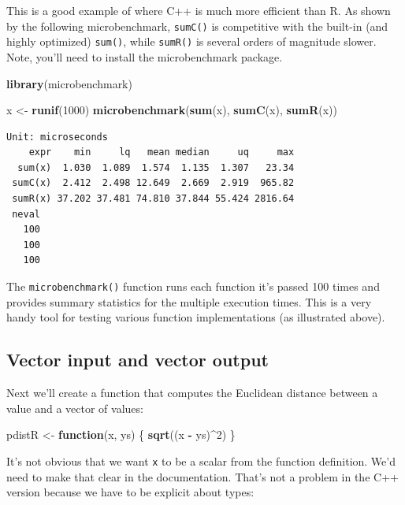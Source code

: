 \documentclass[]{krantz}
\makeatletter
\newenvironment{Shaded}{\begin{snugshade}}{\end{snugshade}}
\newcommand{\KeywordTok}[1]{\textcolor[rgb]{0.27,0.27,0.27}{\textbf{#1}}}
\newcommand{\DecValTok}[1]{\textcolor[rgb]{0.06,0.06,0.06}{#1}}
\newcommand{\StringTok}[1]{\textcolor[rgb]{0.5,0.5,0.5}{#1}}
\newcommand{\ControlFlowTok}[1]{\textcolor[rgb]{0.27,0.27,0.27}{\textbf{#1}}}
\newcommand{\OperatorTok}[1]{\textcolor[rgb]{0.43,0.43,0.43}{\textbf{#1}}}
\newcommand{\NormalTok}[1]{#1}
\newenvironment{kframe}{%
\medskip{}
\setlength{\fboxsep}{.8em}
 \def\at@end@of@kframe{}%
 \ifinner\ifhmode%
  \def\at@end@of@kframe{\end{minipage}}%
  \begin{minipage}{\columnwidth}%
 \fi\fi%
 \def\FrameCommand##1{\hskip\@totalleftmargin \hskip-\fboxsep
 \colorbox{shadecolor}{##1}\hskip-\fboxsep
     \hskip-\linewidth \hskip-\@totalleftmargin \hskip\columnwidth}%
 \MakeFramed {\advance\hsize-\width
   \@totalleftmargin\z@ \linewidth\hsize
   \@setminipage}}%
 {\par\unskip\endMakeFramed%
 \at@end@of@kframe}
\renewenvironment{Shaded}{\begin{kframe}}{\end{kframe}}
\makeatother
\begin{document}
This is a good example of where C++ is much more efficient than R. As
shown by the following microbenchmark, \texttt{sumC()} is competitive
with the built-in (and highly optimized) \texttt{sum()}, while
\texttt{sumR()} is several orders of magnitude slower. Note, you'll need
to install the microbenchmark package.

\begin{Shaded}
\begin{Highlighting}[]
\KeywordTok{library}\NormalTok{(microbenchmark)}

\NormalTok{x <-}\StringTok{ }\KeywordTok{runif}\NormalTok{(}\DecValTok{1000}\NormalTok{)}
\KeywordTok{microbenchmark}\NormalTok{(}\KeywordTok{sum}\NormalTok{(x), }\KeywordTok{sumC}\NormalTok{(x), }\KeywordTok{sumR}\NormalTok{(x))}
\end{Highlighting}
\end{Shaded}

\begin{verbatim}
Unit: microseconds
    expr    min     lq   mean median     uq     max
  sum(x)  1.030  1.089  1.574  1.135  1.307   23.34
 sumC(x)  2.412  2.498 12.649  2.669  2.919  965.82
 sumR(x) 37.202 37.481 74.810 37.844 55.424 2816.64
 neval
   100
   100
   100
\end{verbatim}

The \texttt{microbenchmark()} function runs each function it's passed
100 times and provides summary statistics for the multiple execution
times. This is a very handy tool for testing various function
implementations (as illustrated above).

\subsection{Vector input and vector
output}\label{vector-input-and-vector-output}

Next we'll create a function that computes the Euclidean distance
between a value and a vector of values:

\begin{Shaded}
\begin{Highlighting}[]
\NormalTok{pdistR <-}\StringTok{ }\ControlFlowTok{function}\NormalTok{(x, ys) \{}
    \KeywordTok{sqrt}\NormalTok{((x }\OperatorTok{-}\StringTok{ }\NormalTok{ys)}\OperatorTok{^}\DecValTok{2}\NormalTok{)}
\NormalTok{\}}
\end{Highlighting}
\end{Shaded}

It's not obvious that we want \texttt{x} to be a scalar from the
function definition. We'd need to make that clear in the documentation.
That's not a problem in the C++ version because we have to be explicit
about types:
\end{document}
